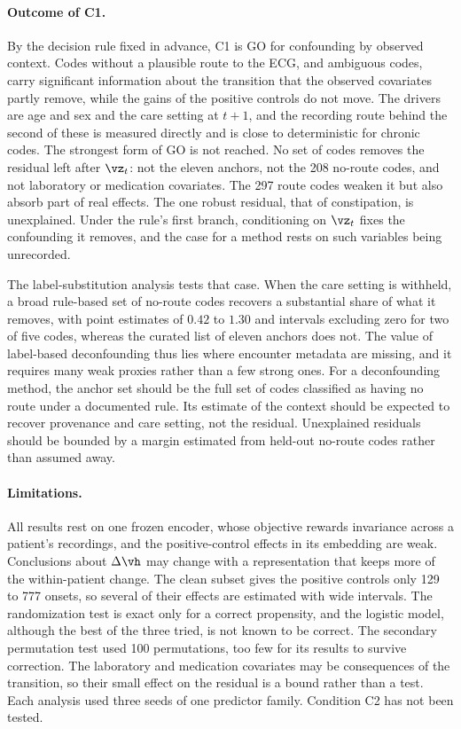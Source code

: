 \paragraph{Outcome of C1.} By the decision rule fixed in advance, C1 is GO for confounding by observed context. Codes without a plausible route to the ECG, and ambiguous codes, carry significant information about the transition that the observed covariates partly remove, while the gains of the positive controls do not move. The drivers are age and sex and the care setting at $t+1$, and the recording route behind the second of these is measured directly and is close to deterministic for chronic codes. The strongest form of GO is not reached. No set of codes removes the residual left after $\vz_t$: not the eleven anchors, not the 208 no-route codes, and not laboratory or medication covariates. The 297 route codes weaken it but also absorb part of real effects. The one robust residual, that of constipation, is unexplained. Under the rule's first branch, conditioning on $\vz_t$ fixes the confounding it removes, and the case for a method rests on such variables being unrecorded.

The label-substitution analysis tests that case. When the care setting is withheld, a broad rule-based set of no-route codes recovers a substantial share of what it removes, with point estimates of $0.42$ to $1.30$ and intervals excluding zero for two of five codes, whereas the curated list of eleven anchors does not. The value of label-based deconfounding thus lies where encounter metadata are missing, and it requires many weak proxies rather than a few strong ones. For a deconfounding method, the anchor set should be the full set of codes classified as having no route under a documented rule. Its estimate of the context should be expected to recover provenance and care setting, not the residual. Unexplained residuals should be bounded by a margin estimated from held-out no-route codes rather than assumed away.

\paragraph{Limitations.} All results rest on one frozen encoder, whose objective rewards invariance across a patient's recordings, and the positive-control effects in its embedding are weak. Conclusions about $\Delta\vh$ may change with a representation that keeps more of the within-patient change. The clean subset gives the positive controls only 129 to 777 onsets, so several of their effects are estimated with wide intervals. The randomization test is exact only for a correct propensity, and the logistic model, although the best of the three tried, is not known to be correct. The secondary permutation test used 100 permutations, too few for its results to survive correction. The laboratory and medication covariates may be consequences of the transition, so their small effect on the residual is a bound rather than a test. Each analysis used three seeds of one predictor family. Condition C2 has not been tested.

